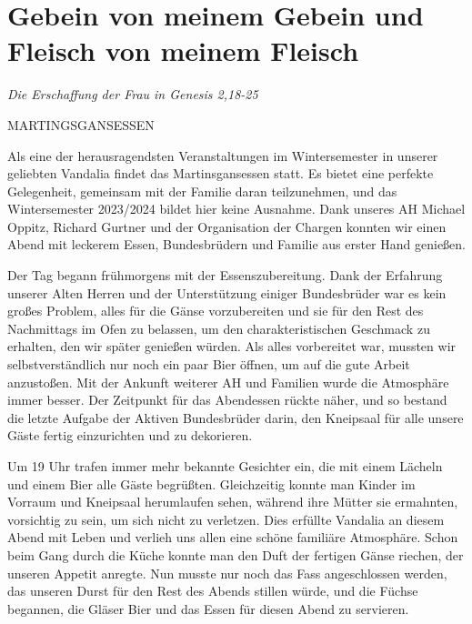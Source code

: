 \section{Gebein von meinem Gebein und Fleisch von meinem Fleisch}


\vspace*{-3mm}
\color{gray}
\textit{Die Erschaffung der Frau in Genesis 2,18-25}


\begin{multicols}{2}

MARTINGSGANSESSEN


Als eine der herausragendsten Veranstaltungen im Wintersemester in unserer geliebten Vandalia findet das Martinsgansessen statt. Es bietet eine perfekte Gelegenheit, gemeinsam mit der Familie daran teilzunehmen, und das Wintersemester 2023/2024 bildet hier keine Ausnahme. Dank unseres AH Michael Oppitz, Richard Gurtner und der Organisation der Chargen konnten wir einen Abend mit leckerem Essen, Bundesbrüdern und Familie aus erster Hand genießen.

Der Tag begann frühmorgens mit der Essenszubereitung. Dank der Erfahrung unserer Alten Herren und der Unterstützung einiger Bundesbrüder war es kein großes Problem, alles für die Gänse vorzubereiten und sie für den Rest des Nachmittags im Ofen zu belassen, um den charakteristischen Geschmack zu erhalten, den wir später genießen würden. Als alles vorbereitet war, mussten wir selbstverständlich nur noch ein paar Bier öffnen, um auf die gute Arbeit anzustoßen. Mit der Ankunft weiterer AH und Familien wurde die Atmosphäre immer besser. Der Zeitpunkt für das Abendessen rückte näher, und so bestand die letzte Aufgabe der Aktiven Bundesbrüder darin, den Kneipsaal für alle unsere Gäste fertig einzurichten und zu dekorieren.

Um 19 Uhr trafen immer mehr bekannte Gesichter ein, die mit einem Lächeln und einem Bier alle Gäste begrüßten. Gleichzeitig konnte man Kinder im Vorraum und Kneipsaal herumlaufen sehen, während ihre Mütter sie ermahnten, vorsichtig zu sein, um sich nicht zu verletzen. Dies erfüllte Vandalia an diesem Abend mit Leben und verlieh uns allen eine schöne familiäre Atmosphäre. Schon beim Gang durch die Küche konnte man den Duft der fertigen Gänse riechen, der unseren Appetit anregte. Nun musste nur noch das Fass angeschlossen werden, das unseren Durst für den Rest des Abends stillen würde, und die Füchse begannen, die Gläser Bier und das Essen für diesen Abend zu servieren.


\end{multicols}
